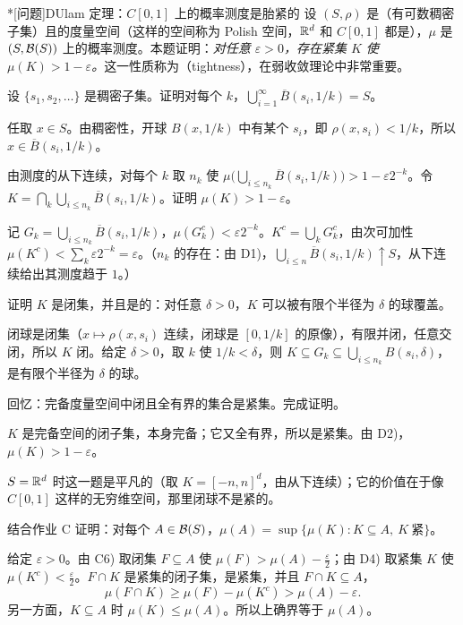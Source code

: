 \begin{probleme}*[问题]{D}{Ulam 定理：$C[0,1]$ 上的概率测度是胎紧的}
设 $(S,\rho)$ 是（有可数稠密子集）且的度量空间（这样的空间称为 Polish 空间，$\mathbb{R}^d$ 和 $C[0,1]$ 都是），$\mu$ 是 $(S,\mathcal{B}(S))$ 上的概率测度。本题证明：\emph{对任意 $\varepsilon>0$，存在紧集 $K$ 使 $\mu(K)>1-\varepsilon$。}这一性质称为（tightness），在弱收敛理论中非常重要。
\begin{questions}
\item 设 $\{s_1,s_2,\dots\}$ 是稠密子集。证明对每个 $k$，$\bigcup_{i=1}^\infty\overline B(s_i,1/k)=S$。
\begin{solution}
任取 $x\in S$。由稠密性，开球 $B(x,1/k)$ 中有某个 $s_i$，即 $\rho(x,s_i)<1/k$，所以 $x\in\overline B(s_i,1/k)$。
\end{solution}
\item 由测度的从下连续，对每个 $k$ 取 $n_k$ 使 $\mu\bigl(\bigcup_{i\leqslant n_k}\overline B(s_i,1/k)\bigr)>1-\varepsilon2^{-k}$。令 $K=\bigcap_k\bigcup_{i\leqslant n_k}\overline B(s_i,1/k)$。证明 $\mu(K)>1-\varepsilon$。
\begin{solution}
记 $G_k=\bigcup_{i\leqslant n_k}\overline B(s_i,1/k)$，$\mu(G_k^c)<\varepsilon2^{-k}$。$K^c=\bigcup_kG_k^c$，由次可加性 $\mu(K^c)<\sum_k\varepsilon2^{-k}=\varepsilon$。（$n_k$ 的存在：由 D1)，$\bigcup_{i\leqslant n}\overline B(s_i,1/k)\uparrow S$，从下连续给出其测度趋于 $1$。）
\end{solution}
\item 证明 $K$ 是闭集，并且是的：对任意 $\delta>0$，$K$ 可以被有限个半径为 $\delta$ 的球覆盖。
\begin{solution}
闭球是闭集（$x\mapsto\rho(x,s_i)$ 连续，闭球是 $[0,1/k]$ 的原像），有限并闭，任意交闭，所以 $K$ 闭。给定 $\delta>0$，取 $k$ 使 $1/k<\delta$，则 $K\subseteq G_k\subseteq\bigcup_{i\leqslant n_k}B(s_i,\delta)$，是有限个半径为 $\delta$ 的球。
\end{solution}
\item 回忆：完备度量空间中闭且全有界的集合是紧集。完成证明。
\begin{solution}
$K$ 是完备空间的闭子集，本身完备；它又全有界，所以是紧集。由 D2)，$\mu(K)>1-\varepsilon$。

$S=\mathbb{R}^d$ 时这一题是平凡的（取 $K=[-n,n]^d$，由从下连续）；它的价值在于像 $C[0,1]$ 这样的无穷维空间，那里闭球不是紧的。
\end{solution}
\item 结合作业 C 证明：对每个 $A\in\mathcal{B}(S)$，$\mu(A)=\sup\{\mu(K):K\subseteq A,\ K\ \text{紧}\}$。
\begin{solution}
给定 $\varepsilon>0$。由 C6) 取闭集 $F\subseteq A$ 使 $\mu(F)>\mu(A)-\frac\varepsilon2$；由 D4) 取紧集 $K$ 使 $\mu(K^c)<\frac\varepsilon2$。$F\cap K$ 是紧集的闭子集，是紧集，并且 $F\cap K\subseteq A$，
\[
\mu(F\cap K)\geqslant\mu(F)-\mu(K^c)>\mu(A)-\varepsilon.
\]
另一方面，$K\subseteq A$ 时 $\mu(K)\leqslant\mu(A)$。所以上确界等于 $\mu(A)$。
\end{solution}
\end{questions}
\end{probleme}


